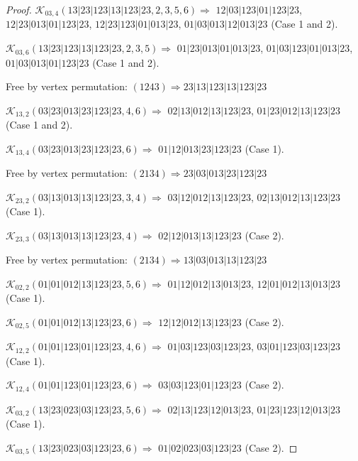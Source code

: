 \documentclass[12pt]{article}
\theoremstyle{plain}
\theoremstyle{definition}
\theoremstyle{remark}
\newcommand{\fancy}[1]{\mathcal{#1}}
\def\K{\fancy{K}}
\begin{document}
\begin{proof}
	\bigskip
	
	$\K_{03,4}(13|23|123|13|123|23,2, 3, 5, 6)\Rightarrow $ $12|03|123|01|123|23$, $12|23|013|01|123|23$, $12|23|123|01|013|23$, $01|03|013|12|013|23$ (Case 1 and 2).
	
	$\K_{03,6}(13|23|123|13|123|23,2, 3, 5)\Rightarrow $ $01|23|013|01|013|23$, $01|03|123|01|013|23$, $01|03|013|01|123|23$ (Case 1 and 2).
	
	
	
	Free by vertex permutation: $(1 2 4 3)\Rightarrow 23|13|123|13|123|23$
	
	
	
	\bigskip
	
	$\K_{13,2}(03|23|013|23|123|23,4, 6)\Rightarrow $ $02|13|012|13|123|23$, $01|23|012|13|123|23$ (Case 1 and 2).
	
	$\K_{13,4}(03|23|013|23|123|23,6)\Rightarrow $ $01|12|013|23|123|23$ (Case 1).
	
	
	
	Free by vertex permutation: $(2 1 3 4)\Rightarrow 23|03|013|23|123|23$
	
	
	
	\bigskip
	
	$\K_{23,2}(03|13|013|13|123|23,3, 4)\Rightarrow $ $03|12|012|13|123|23$, $02|13|012|13|123|23$ (Case 1).
	
	$\K_{23,3}(03|13|013|13|123|23,4)\Rightarrow $ $02|12|013|13|123|23$ (Case 2).
	
	
	
	Free by vertex permutation: $(2 1 3 4)\Rightarrow 13|03|013|13|123|23$
	
	
	
	\bigskip
	
	$\K_{02,2}(01|01|012|13|123|23,5, 6)\Rightarrow $ $01|12|012|13|013|23$, $12|01|012|13|013|23$ (Case 1).
	
	$\K_{02,5}(01|01|012|13|123|23,6)\Rightarrow $ $12|12|012|13|123|23$ (Case 2).
	
	
	\bigskip
	
	$\K_{12,2}(01|01|123|01|123|23,4, 6)\Rightarrow $ $01|03|123|03|123|23$, $03|01|123|03|123|23$ (Case 1).
	
	$\K_{12,4}(01|01|123|01|123|23,6)\Rightarrow $ $03|03|123|01|123|23$ (Case 2).
	
	
	\bigskip
	
	$\K_{03,2}(13|23|023|03|123|23,5, 6)\Rightarrow $ $02|13|123|12|013|23$, $01|23|123|12|013|23$ (Case 1).
	
	$\K_{03,5}(13|23|023|03|123|23,6)\Rightarrow $ $01|02|023|03|123|23$ (Case 2).
	

\end{proof}
\end{document}
